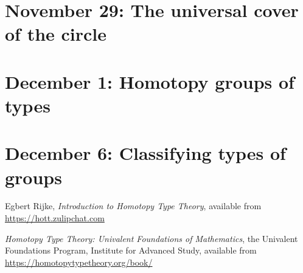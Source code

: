 \documentclass{amsart}
\theoremstyle{theorem}
\theoremstyle{definition}
\theoremstyle{remark}
\newcommand{\0}{\mathbbe{0}}
\newcommand{\1}{\mathbbe{1}}
\newcommand{\2}{\mathbbe{2}}
\newcommand{\3}{\mathbbe{3}}
\newcommand{\4}{\mathbbe{4}}
\begin{document}
\section*{November 29: The universal cover of the circle}
\section*{December 1: Homotopy groups of types}
\section*{December 6: Classifying types of groups}


\begin{thebibliography}{UF}


 Egbert Rijke, \emph{Introduction to Homotopy Type Theory}, available from \url{https://hott.zulipchat.com}

 \emph{Homotopy Type Theory: Univalent Foundations of Mathematics}, the Univalent Foundations Program, Institute for Advanced Study, available from \url{https://homotopytypetheory.org/book/}

\end{thebibliography}
\end{document}

